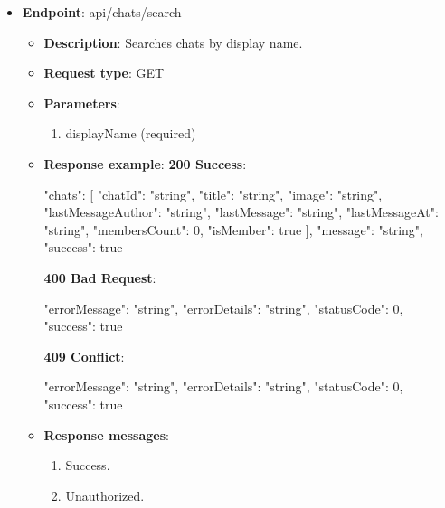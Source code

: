 \begin{itemize}
    \item \textbf{Endpoint}: api/chats/search
    \begin{itemize}
        \item \textbf{Description}: Searches chats by display name.
        \item \textbf{Request type}: GET
        \item \textbf{Parameters}:
        \begin{enumerate}
            \item displayName (required)
        \end{enumerate}
        \item \textbf{Response example}:
        \textbf{200 Success}:
        \begin{spverbatim}
        {
            "chats": [
                {
                "chatId": "string",
                "title": "string",
                "image": "string",
                "lastMessageAuthor": "string",
                "lastMessage": "string",
                "lastMessageAt": "string",
                "membersCount": 0,
                "isMember": true
            }
            ],
            "message": "string",
            "success": true
        }
        \end{spverbatim}
        \textbf{400 Bad Request}:
        \begin{spverbatim}
        {
            "errorMessage": "string",
            "errorDetails": "string",
            "statusCode": 0,
            "success": true
        }
        \end{spverbatim}
        \textbf{409 Conflict}:
        \begin{spverbatim}
        {
            "errorMessage": "string",
            "errorDetails": "string",
            "statusCode": 0,
            "success": true
        }
        \end{spverbatim}
        \item \textbf{Response messages}:
        \begin{enumerate}
            \item Success.
            \item Unauthorized.
        \end{enumerate}
    \end{itemize}

\end{itemize}